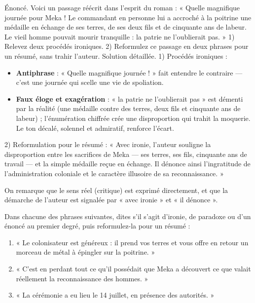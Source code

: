 \documentclass[11pt]{article}
\begin{document}
\begin{exoresolu}
Énoncé. Voici un passage réécrit dans l'esprit du roman : « Quelle magnifique journée pour Meka ! Le commandant en personne lui a accroché à la poitrine une médaille en échange de ses terres, de ses deux fils et de cinquante ans de labeur. Le vieil homme pouvait mourir tranquille : la patrie ne l'oublierait pas. » 1) Relevez deux procédés ironiques. 2) Reformulez ce passage en deux phrases pour un résumé, sans trahir l'auteur.
\tcblower
Solution détaillée.
1) Procédés ironiques :
\begin{itemize}
\item \textbf{Antiphrase} : « Quelle magnifique journée ! » fait entendre le contraire — c'est une journée qui scelle une vie de spoliation.
\item \textbf{Faux éloge et exagération} : « la patrie ne l'oublierait pas » est démenti par la réalité (une médaille contre des terres, deux fils et cinquante ans de labeur) ; l'énumération chiffrée crée une disproportion qui trahit la moquerie. Le ton décalé, solennel et admiratif, renforce l'écart.
\end{itemize}
2) Reformulation pour le résumé : « Avec ironie, l'auteur souligne la disproportion entre les sacrifices de Meka — ses terres, ses fils, cinquante ans de travail — et la simple médaille reçue en échange. Il dénonce ainsi l'ingratitude de l'administration coloniale et le caractère illusoire de sa reconnaissance. »\par
On remarque que le sens réel (critique) est exprimé directement, et que la démarche de l'auteur est signalée par « avec ironie » et « il dénonce ».
\end{exoresolu}

\begin{exercice}
Dans chacune des phrases suivantes, dites s'il s'agit d'ironie, de paradoxe ou d'un énoncé au premier degré, puis reformulez-la pour un résumé :
\begin{enumerate}
\item « Le colonisateur est généreux : il prend vos terres et vous offre en retour un morceau de métal à épingler sur la poitrine. »
\item « C'est en perdant tout ce qu'il possédait que Meka a découvert ce que valait réellement la reconnaissance des hommes. »
\item « La cérémonie a eu lieu le 14 juillet, en présence des autorités. »
\end{enumerate}
\end{exercice}
\end{document}
